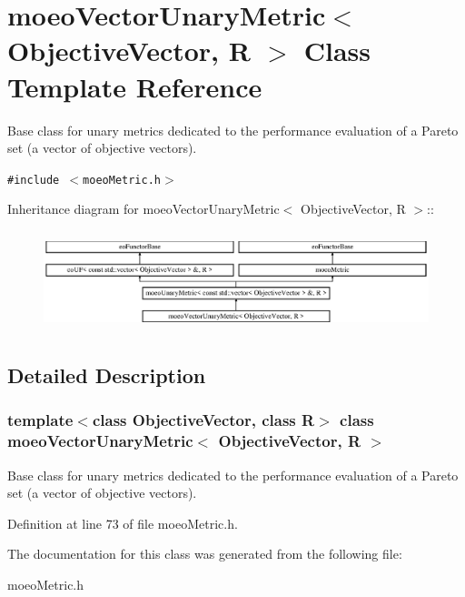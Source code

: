 \section{moeo\-Vector\-Unary\-Metric$<$ Objective\-Vector, R $>$ Class Template Reference}
\label{classmoeoVectorUnaryMetric}
Base class for unary metrics dedicated to the performance evaluation of a Pareto set (a vector of objective vectors).  


{\tt \#include $<$moeo\-Metric.h$>$}

Inheritance diagram for moeo\-Vector\-Unary\-Metric$<$ Objective\-Vector, R $>$::\begin{figure}[H]
\begin{center}
\leavevmode
\includegraphics[height=2.91667cm]{classmoeoVectorUnaryMetric}
\end{center}
\end{figure}


\subsection{Detailed Description}
\subsubsection*{template$<$class Objective\-Vector, class R$>$ class moeo\-Vector\-Unary\-Metric$<$ Objective\-Vector, R $>$}

Base class for unary metrics dedicated to the performance evaluation of a Pareto set (a vector of objective vectors). 



Definition at line 73 of file moeo\-Metric.h.

The documentation for this class was generated from the following file:\begin{CompactItemize}
\item 
moeo\-Metric.h\end{CompactItemize}
